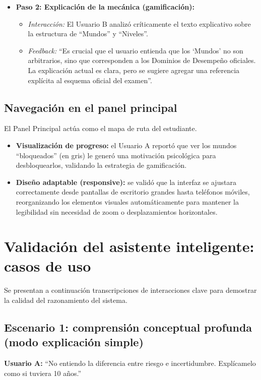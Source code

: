 \begin{itemize}
\item   \textbf{Paso 2: Explicación de la mecánica (gamificación):}
\begin{itemize}
\item   \textit{Interacción:} El Usuario B analizó críticamente el texto explicativo sobre la estructura de \enquote{Mundos} y \enquote{Niveles}.
\item   \textit{Feedback:} \enquote{Es crucial que el usuario entienda que los `Mundos' no son arbitrarios, sino que corresponden a los Dominios de Desempeño oficiales. La explicación actual es clara, pero se sugiere agregar una referencia explícita al esquema oficial del examen}.
\end{itemize}
\end{itemize}

\subsection{Navegación en el panel principal}
El Panel Principal actúa como el mapa de ruta del estudiante.
\begin{itemize}
\item   \textbf{Visualización de progreso:} el Usuario A reportó que ver los mundos \enquote{bloqueados} (en gris) le generó una motivación psicológica para desbloquearlos, validando la estrategia de gamificación.
\item   \textbf{Diseño adaptable (responsive):} se validó que la interfaz se ajustara correctamente desde pantallas de escritorio grandes hasta teléfonos móviles, reorganizando los elementos visuales automáticamente para mantener la legibilidad sin necesidad de zoom o desplazamientos horizontales.
\end{itemize}

\section{Validación del asistente inteligente: casos de uso}

Se presentan a continuación transcripciones de interacciones clave para demostrar la calidad del razonamiento del sistema.

\subsection{Escenario 1: comprensión conceptual profunda (modo explicación simple)}
\textbf{Usuario A:} \enquote{No entiendo la diferencia entre riesgo e incertidumbre. Explícamelo como si tuviera 10 años.}

